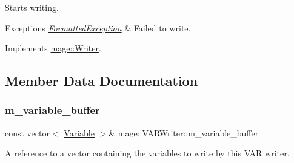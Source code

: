 Starts writing.


\begin{DoxyExceptions}{Exceptions}
{\em \hyperlink{classmage_1_1_formatted_exception}{Formatted\+Exception}} & Failed to write. \\
\hline
\end{DoxyExceptions}


Implements \hyperlink{classmage_1_1_writer_a9baf695ef7f6180bef883f60bcb3ac07}{mage\+::\+Writer}.



\subsection{Member Data Documentation}
\hypertarget{classmage_1_1_v_a_r_writer_a7cfb811d496a6883478ddf680babaa7a}{}\label{classmage_1_1_v_a_r_writer_a7cfb811d496a6883478ddf680babaa7a} 
\subsubsection{\texorpdfstring{m\+\_\+variable\+\_\+buffer}{m\_variable\_buffer}}
{\footnotesize\ttfamily const vector$<$ \hyperlink{structmage_1_1_variable}{Variable} $>$\& mage\+::\+V\+A\+R\+Writer\+::m\+\_\+variable\+\_\+buffer\hspace{0.3cm}{\ttfamily [private]}}

A reference to a vector containing the variables to write by this V\+AR writer. 